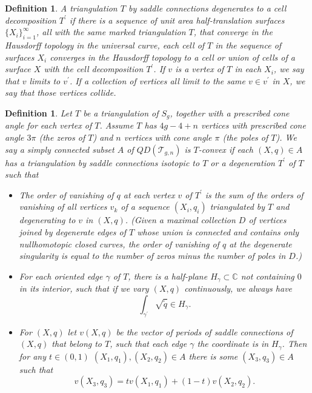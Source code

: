 \documentclass[12pt]{article}
\newtheorem{definition}[theorem]{Definition}
\newcommand{\cc}{\mathbb{C}}
\begin{document}
\begin{definition}A triangulation $T$ by saddle connections \emph{degenerates} to a cell decomposition $T^\prime$ if there is a sequence of unit area half-translation surfaces $\{X_i\}_{i = 1}^\infty$, all with the same marked triangulation $T$, that converge in the Hausdorff topology in the universal curve, each cell of $T$ in the sequence of surfaces $X_i$ converges in the Hausdorff topology to a cell or union of cells of a surface $X$ with the cell decomposition $T^\prime$. If $v$ is a vertex of $T$ in each $X_i$, we say that $v$ \emph{limits to} $v^\prime$. If a collection of vertices all limit to the same $v \in v^\prime$ in $X$, we say that those vertices \emph{collide}.\end{definition}

\begin{definition}Let $T$ be a triangulation of $S_g$, together with a prescribed cone angle for each vertex of $T$. Assume $T$ has $4g-4 + n$ vertices with prescribed cone angle $3\pi$ (the zeros of $T$) and $n$ vertices with cone angle $\pi$ (the poles of $T$). We say a simply connected subset $A$ of $QD(\mathcal{T}_{g,n})$ is \emph{$T$-convex} if each $(X,q) \in A$ has a triangulation by saddle connections isotopic to $T$ or a degeneration $T^\prime$ of $T$ such that

\begin{itemize}
\item The order of vanishing of $q$ at each vertex $v$ of $T^\prime$ is the sum of the orders of vanishing of all vertices $v_k$ of a sequence $(X_i,q_i)$ triangulated by $T$ and degenerating to $v$ in $(X,q)$. (Given a maximal collection $D$ of vertices joined by degenerate edges of $T$ whose union is connected and contains only nullhomotopic closed curves, the order of vanishing of $q$ at the degenerate singularity is equal to the number of zeros minus the number of poles in $D$.)
\item For each oriented edge $\gamma$ of $T$, there is a half-plane $H_\gamma \subset \cc$ not containing $0$ in its interior, such that if we vary $(X,q)$ continuously, we always have $$\int_{\gamma^\prime}\sqrt{\tilde{q}} \in H_\gamma.$$
\item For $(X,q)$ let $v(X,q)$ be the vector of periods of saddle connections of $(X,q)$ that belong to $T$, such that each edge $\gamma$ the coordinate is in $H_\gamma$. Then for any $t \in (0,1)$ $(X_1,q_1),(X_2,q_2) \in A$ there is some $(X_3,q_3) \in A$ such that $$v(X_3,q_3) = tv(X_1,q_1) + (1-t)v(X_2,q_2).$$
\end{itemize}\end{definition}
\end{document}
